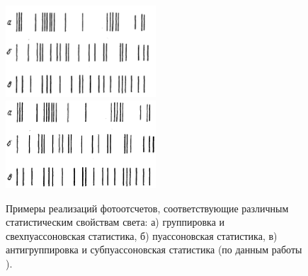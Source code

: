 \begin{figure}
\centering

\ifpdf
\includegraphics[angle=0, width=0.5\textwidth]
{./part3/nonclass/nonclassphoto.pdf}
\else
\includegraphics[angle=0, width=0.5\textwidth]
{./part3/nonclass/nonclassphoto.eps}
\fi
%

\caption{Примеры реализаций фотоотсчетов, соответствующие различным
  статистическим свойствам света: а) группировка и свехпуассоновская
  статистика, б) пуассоновская статистика, в) антигруппировка и
  субпуассоновская статистика (по данным работы \cite{bNonclassSmirnovTroshin}). }
\label{figPart3Nonclass1}
\end{figure}

